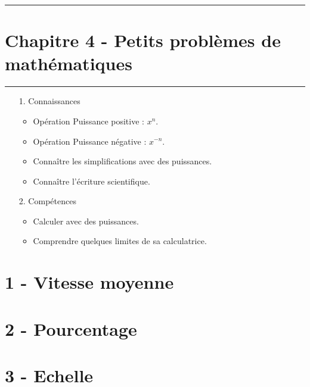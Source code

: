 \documentclass[12pt]{article}
\newcommand{\horrule}[1]{\rule{\linewidth}{#1}} %
\begin{document}

\newtheorem{Definition}{Définition}
\newtheorem{Theorem}{Théorème}
\newtheorem{Proposition}{Propriété}

\renewcommand{\labelitemi}{$\bullet$}
\renewcommand{\labelitemii}{$\circ$}

\setlength{\columnseprule}{1pt}

\horrule{2px}
\section*{Chapitre 4 - Petits problèmes de mathématiques}
\horrule{2px}

\begin{enumerate}
\item[1.] Connaissances
  \begin{itemize}
  \item Opération Puissance positive : $x^n$.
  \item Opération Puissance négative : $x^{-n}$.
  \item Connaître les simplifications avec des puissances.
  \item Connaître l'écriture scientifique.
  \end{itemize}
\item[2.] Compétences
  \begin{itemize}
  \item Calculer avec des puissances.
  \item Comprendre quelques limites de sa calculatrice.
  \end{itemize}
\end{enumerate}

\section*{1 - Vitesse moyenne}

\section*{2 - Pourcentage}

\section*{3 - Echelle}
\end{document}
